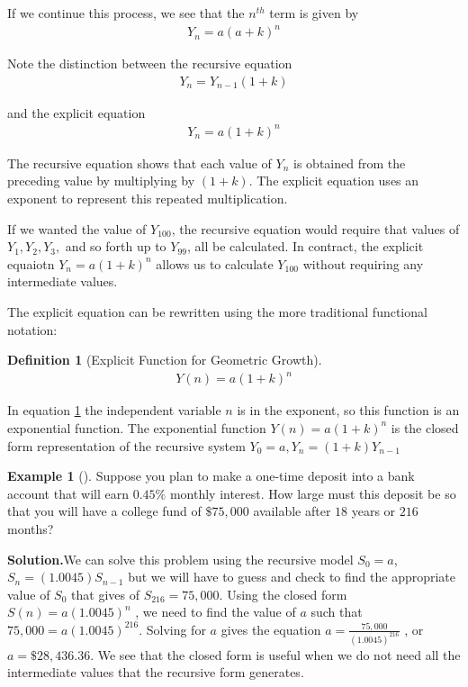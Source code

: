 \documentclass[10pt,]{book}
\theoremstyle{plain}
\theoremstyle{definition}
\newtheorem{definition}[theorem]{Definition}
\theoremstyle{definition}
\newtheorem{example}[theorem]{Example}
\theoremstyle{definition}
\numberwithin{equation}{section}
\begin{document}
\par
If we continue this process, we see that the \(n^{th}\) term is given by%
%
\begin{gather*}
Y_n=a(a+k)^n
\end{gather*}
\par
Note the distinction between the recursive equation%
%
\begin{gather*}
Y_n=Y_{n-1}(1+k)
\end{gather*}
\par
and the explicit equation%
%
\begin{gather*}
Y_n=a(1+k)^n
\end{gather*}
\par
The recursive equation shows that each value of \(Y_n\)  is obtained from the preceding value by multiplying by \((1+k)\). The explicit equation uses an exponent to represent this repeated multiplication.%
\par
If we wanted the value of \(Y_{100}\), the recursive equation would require that values of \(Y_1, Y_2, Y_3,\) and so forth up to \(Y_{99}\),  all be calculated. In contract, the explicit equaiotn \(Y_n=a(1+k)^n\) allows us to calculate \(Y_{100}\) without requiring any intermediate values.%
\par
The explicit equation can be rewritten using the more traditional functional notation:%
\begin{definition}[{Explicit Function for Geometric Growth}]\label{explicit-geometric-growth-equation}
%
\begin{gather*}
Y(n)=a(1+k)^n
\end{gather*}
\end{definition}
\par
In equation \hyperref[explicit-geometric-growth-equation]{\ref{explicit-geometric-growth-equation}} the independent variable \(n\) is in the exponent, so this function is an exponential function. The exponential function \(Y(n)=a(1+k)^n\) is the closed form representation of the recursive system  \(Y_0=a,Y_n=(1+k)Y_{n-1}\)%
\begin{example}[]\label{example-one-time-bank-desposit}
Suppose you plan to make a one-time deposit into a bank account that will earn \(0.45\%\) monthly interest.  How large must this deposit be so that you will have a college fund of \(\$75,000\) available after \(18\) years or \(216\) months?%
\par\medskip\noindent%
\textbf{Solution.}\quad We can solve this problem using the recursive model \(S_0 = a\), \(S_n = (1.0045) S_{n-1}\) but we will have to guess and check to find the appropriate value of \(S_0\) that gives of \(S_{216} = 75,000\).  Using the closed form \(S(n)=a(1.0045)^n\) , we need to find the value of \(a\) such that \(75,000 = a (1.0045)^{216}\).  Solving for \(a\) gives the equation \(a = \frac{75,000}{(1.0045)^{216}}\) , or \(a = \$28,436.36\).  We see that the closed form is useful when we do not need all the intermediate values that the recursive form generates.%
\end{example}
\end{document}

